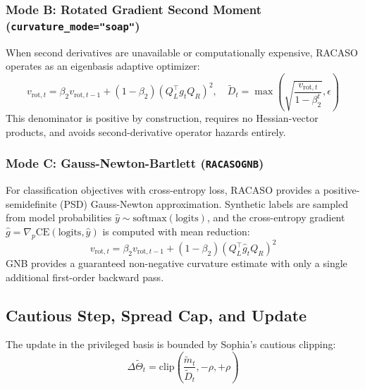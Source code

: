 \documentclass[11pt,a4paper]{article}
\begin{document}
\subsubsection{Mode B: Rotated Gradient Second Moment (\texttt{curvature\_mode="soap"})}
When second derivatives are unavailable or computationally expensive, RACASO operates as an eigenbasis adaptive optimizer:
\begin{equation}
v_{\text{rot}, t} = \beta_2 v_{\text{rot}, t-1} + (1 - \beta_2) (Q_L^\top g_t Q_R)^2, \quad \tilde{D}_t = \max\left(\sqrt{\frac{v_{\text{rot}, t}}{1 - \beta_2^t}}, \epsilon\right)
\end{equation}
This denominator is positive by construction, requires no Hessian-vector products, and avoids second-derivative operator hazards entirely.

\subsubsection{Mode C: Gauss-Newton-Bartlett (\texttt{RACASOGNB})}
For classification objectives with cross-entropy loss, RACASO provides a positive-semidefinite (PSD) Gauss-Newton approximation. Synthetic labels are sampled from model probabilities $\hat{y} \sim \text{softmax}(\text{logits})$, and the cross-entropy gradient $\hat{g} = \nabla_p \text{CE}(\text{logits}, \hat{y})$ is computed with mean reduction:
\begin{equation}
v_{\text{rot}, t} = \beta_2 v_{\text{rot}, t-1} + (1 - \beta_2) (Q_L^\top \hat{g}_t Q_R)^2
\end{equation}
GNB provides a guaranteed non-negative curvature estimate with only a single additional first-order backward pass.

\subsection{Cautious Step, Spread Cap, and Update}

The update in the privileged basis is bounded by Sophia's cautious clipping:
\begin{equation}
\Delta \tilde{\Theta}_t = \text{clip}\left(\frac{\hat{\tilde{m}}_t}{\tilde{D}_t}, -\rho, +\rho\right)
\end{equation}
\end{document}

